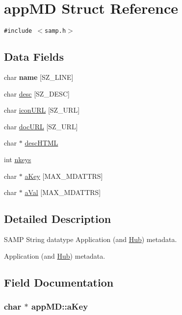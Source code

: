 \hypertarget{structappMD}{
\section{appMD Struct Reference}
\label{structappMD}
}
{\tt \#include $<$samp.h$>$}

\subsection*{Data Fields}
\begin{CompactItemize}
\item 
\hypertarget{structappMD_138f7e855439b5960fedf2bfb28f473e}{
char \textbf{name} \mbox{[}SZ\_\-LINE\mbox{]}}
\label{structappMD_138f7e855439b5960fedf2bfb28f473e}

\item 
char \hyperlink{structappMD_fe527cb05f296f8e8b8144bf444beffd}{desc} \mbox{[}SZ\_\-DESC\mbox{]}
\item 
char \hyperlink{structappMD_8ff19215559267a838fe300ca4f743a7}{iconURL} \mbox{[}SZ\_\-URL\mbox{]}
\item 
char \hyperlink{structappMD_53945cba18e159fcdd4fb627b1d1d312}{docURL} \mbox{[}SZ\_\-URL\mbox{]}
\item 
char $\ast$ \hyperlink{structappMD_652f4b568b3de167fa0886613c8c6656}{descHTML}
\item 
int \hyperlink{structappMD_4b9f5ebb7d20beb53a7bfe192009e89a}{nkeys}
\item 
char $\ast$ \hyperlink{structappMD_cf4d62dbfeb28cb8c503d6a4d1598a8d}{aKey} \mbox{[}MAX\_\-MDATTRS\mbox{]}
\item 
char $\ast$ \hyperlink{structappMD_13ae9876a351aee3fe5b861733aff77a}{aVal} \mbox{[}MAX\_\-MDATTRS\mbox{]}
\end{CompactItemize}


\subsection{Detailed Description}
SAMP String datatype Application (and \hyperlink{structHub}{Hub}) metadata.

Application (and \hyperlink{structHub}{Hub}) metadata. 

\subsection{Field Documentation}
\hypertarget{structappMD_cf4d62dbfeb28cb8c503d6a4d1598a8d}{
\subsubsection[{aKey}]{\setlength{\rightskip}{0pt plus 5cm}char $\ast$ {\bf appMD::aKey}}}
\label{structappMD_cf4d62dbfeb28cb8c503d6a4d1598a8d}


